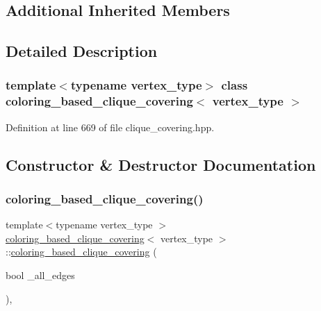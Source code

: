 \subsection*{Additional Inherited Members}


\subsection{Detailed Description}
\subsubsection*{template$<$typename vertex\+\_\+type$>$\newline
class coloring\+\_\+based\+\_\+clique\+\_\+covering$<$ vertex\+\_\+type $>$}



Definition at line 669 of file clique\+\_\+covering.\+hpp.



\subsection{Constructor \& Destructor Documentation}
\mbox{\label{classcoloring__based__clique__covering_a2e21f5baf4d15ba46e0be51e3edcfbe2}} 
\subsubsection{\texorpdfstring{coloring\+\_\+based\+\_\+clique\+\_\+covering()}{coloring\_based\_clique\_covering()}}
{\footnotesize\ttfamily template$<$typename vertex\+\_\+type $>$ \\
\hyperlink{classcoloring__based__clique__covering}{coloring\+\_\+based\+\_\+clique\+\_\+covering}$<$ vertex\+\_\+type $>$\+::\hyperlink{classcoloring__based__clique__covering}{coloring\+\_\+based\+\_\+clique\+\_\+covering} (\begin{DoxyParamCaption}\item[{bool}]{\+\_\+all\+\_\+edges }\end{DoxyParamCaption})\hspace{0.3cm}{\ttfamily [inline]}, {\ttfamily [explicit]}}



